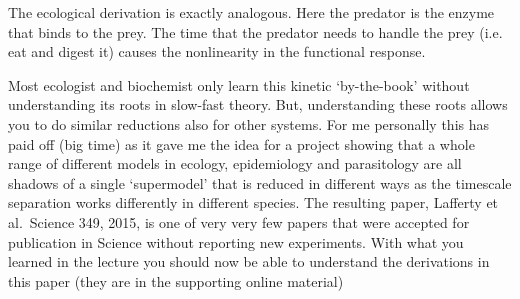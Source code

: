 The ecological derivation is exactly analogous. Here the predator is the enzyme that binds to the prey. The time that the predator needs to handle the prey (i.e. eat and digest it) causes the nonlinearity in the functional response. 

Most ecologist and  biochemist only learn this kinetic `by-the-book' without understanding its roots in slow-fast theory.
But, understanding these roots allows you to do similar reductions also for other systems. For me personally this has paid off (big time) as it gave me the idea for a project showing that a whole range of different models in ecology, epidemiology and parasitology are all shadows of a single `supermodel' that is reduced in different ways as the timescale separation works differently in different species. The resulting paper, Lafferty et al.~Science 349, 2015, is one of very very few papers that were accepted for publication in Science without reporting new experiments. With what you learned in the lecture you should now be able to understand the derivations in this paper (they are in the supporting online material)
